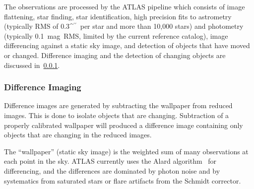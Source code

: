 \documentclass[aps,prb,twocolumn,superscriptaddress]{revtex4-1}
\def\arcsec{\ifmmode^{\prime\prime}\else$^{\prime\prime}$\fi}
\begin{document}
The observations are processed by the ATLAS pipeline which consists of
image flattening, star finding, star identification, high precision
fits to astrometry (typically RMS of 0.3\arcsec\ per star and more
than 10,000 stars) and photometry (typically 0.1~mag~RMS, limited by
the current reference catalog), image differencing against a static sky
image, and detection of objects that have moved or changed.  
Difference imaging and the detection of changing objects 
are discussed in~\cref{sec:diffimg}.


\subsubsection{Difference Imaging}\label{sec:diffimg}

Difference images are generated by subtracting the wallpaper from reduced 
images. This is done to isolate objects that are changing. Subtraction 
of a properly calibrated wallpaper will produced a difference image 
containing only objects that are changing in the reduced images.  

The ``wallpaper'' (static sky image) is the weighted sum of many 
observations at each point in the sky.  ATLAS currently uses the
Alard algorithm~\cite{Alard_algorithm}
for differencing, and the
differences are dominated by photon noise and by systematics from
saturated stars or flare artifacts from the Schmidt corrector.
\end{document}
